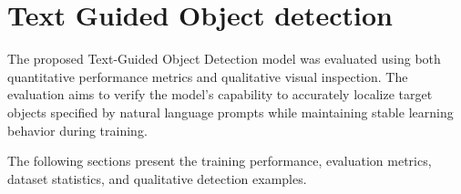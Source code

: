 





% 

\section{Text Guided Object detection}
\label{chap:testing-results}

The proposed Text-Guided Object Detection model was evaluated using both quantitative performance metrics and qualitative visual inspection. The evaluation aims to verify the model's capability to accurately localize target objects specified by natural language prompts while maintaining stable learning behavior during training.

The following sections present the training performance, evaluation metrics, dataset statistics, and qualitative detection examples.

